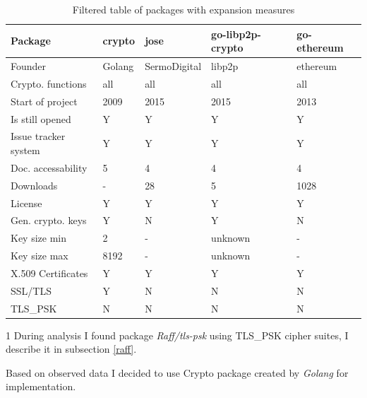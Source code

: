 \documentclass[
  digital, %
  notable,   %
  lof,     %
  lot,     %
]{fithesis3}
\begin{document}
\begin{table}[th]
\caption{Filtered table of packages with expansion measures} 
\begin{threeparttable}
\begin{tabular}{|P{2.3cm}||P{1.1cm} P{2.4cm} P{2.4cm} P{2.4cm}|}
\hline \hline
{}
Package & crypto & jose & go-libp2p-crypto & go-ethereum \\ [2ex]
\hline \hline
Founder & Golang & SermoDigital & libp2p & ethereum \\ [2ex]
Crypto. functions & all & all & all & all \\ [3.3ex]
Start of project & 2009 & 2015 & 2015 & 2013 \\ [3.3ex]
Is still opened & Y & Y & Y & Y \\ [3.3ex]
Issue tracker system & Y & Y & Y & Y \\ [3.3ex]
Doc. accessability & 5 & 4 & 4 & 4 \\ [3.3ex]
Downloads & - & 28 & 5 & 1028 \\ [2ex]
License & Y & Y & Y & Y \\ [2ex]
Gen. crypto. keys & Y & N & Y & N \\ [3.3ex]
Key size min & 2 & - & unknown & - \\ [3.3ex]
Key size max & 8192 & - & unknown & - \\ [3.3ex]
X.509 Certificates & Y & Y & Y & Y \\ [3.3ex]
SSL/TLS & Y & N & N & N \\ [2ex]
TLS\_PSK  & N & N & N & N \\ [2ex]
\hline
\end{tabular}
\begin{tablenotes}
\item[1] During analysis I found package \textit{Raff/tls-psk} using TLS\_PSK cipher suites, I describe it in subsection \ref{raff}.%
\end{tablenotes}
\end{threeparttable}
\label{table:analysis23} 
\end{table}

\nocite{crypto}
\nocite{jose}
\nocite{libp2p}
\nocite{ethereum}

Based on observed data I decided to use Crypto package created by \textit{Golang} for 
implementation. 
\end{document}
